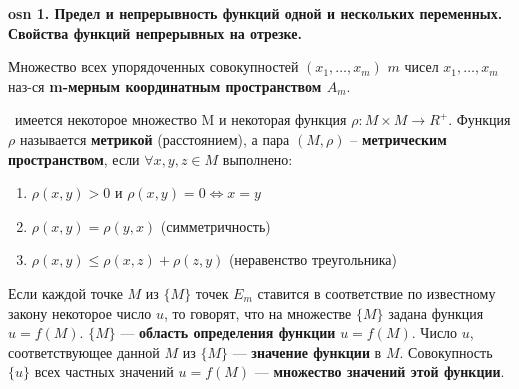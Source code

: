 \textbf{\LARGE osn 1. Предел и непрерывность функций одной и нескольких переменных. Свойства функций  непрерывных на отрезке.}

Множество всех упорядоченных совокупностей $(x_1,\dots,x_m)$ $m$ чисел $x_1,\dots,x_m$ наз-ся \textbf{m-мерным координатным пространством $A_m$}.

\bigbreak
\mathLet \ имеется  некоторое множество M и некоторая функция $\rho : M \times M \rightarrow R^+$. Функция $\rho$ называется \textbf{метрикой} (расстоянием), а пара $(M, \rho)$ -- \textbf{метрическим пространством}, если $\forall x, y, z \in M$ выполнено:
\begin{enumerate}
    \item $\rho(x, y) > 0$ и $\rho(x, y) = 0 \Leftrightarrow  x = y$
    \item $\rho(x, y) = \rho(y, x)$ (симметричность)
    \item $\rho(x, y) \leq \rho(x, z) + \rho(z, y)$ (неравенство треугольника)
\end{enumerate}

\bigbreak
Если каждой точке $M$ из $\{M\}$ точек $E_m$ ставится в соответствие по известному закону некоторое число $u$, то говорят, что на множестве $\{M\}$ задана функция $u = f(M)$. $\{M\}$ --- \textbf{область определения функции} $u = f(M)$. Число $u$, соответствующее данной $M$ из $\{M\}$ ---\textbf{ значение функции} в $M$. Совокупность $\{u\}$ всех частных значений $u = f(M)$ --- \textbf{множество значений этой функции}.


